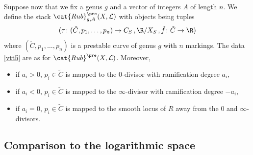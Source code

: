 \documentclass[a4paper,12pt]{article} %
\newcommand{\on}[1]{\operatorname{#1}}
\newcommand{\ca}[1]{{\mathcal{#1}}}
\theoremstyle{definition}
\theoremstyle{plain}%
\begin{document}
Suppose now that we fix a genus $g$ and a vector of integers $A$ of length $n$. We define the stack $\cat{Rub}^{\pre}_{g,A}(X, \ca L)$ with objects being tuples 
\begin{equation}\label{vtt5}
(\tau\colon (\tilde C, p_1,\ldots,p_n) \to C_S\, , \R/X_S\, , \tilde{f}\colon \tilde C \to \R)
\end{equation}
where $(\tilde{C},p_1,\ldots,p_n)$ is a prestable curve of genus $g$ with $n$
markings.
The data \eqref{vtt5} are as for $\cat{Rub}^{\pre}(X, \ca L)$. Moreover, 
\begin{itemize}

\item[$\bullet$]
if $a_i >0$,  $p_i\in \tilde{C}$ is mapped to the $0$-divisor with
 ramification degree $a_i$,
 \item[$\bullet$]
if $a_i <0$,  $p_i\in \tilde{C}$ is mapped to the $\infty$-divisor with
 ramification degree $-a_i$,
\item[$\bullet$] if $a_i=0$, $p_i\in \tilde{C}$ is mapped to the smooth locus of $R$
away from the $0$ and $\infty$-divisors.
\end{itemize}



\subsection{Comparison to the logarithmic space}\label{clog}


\end{document}
